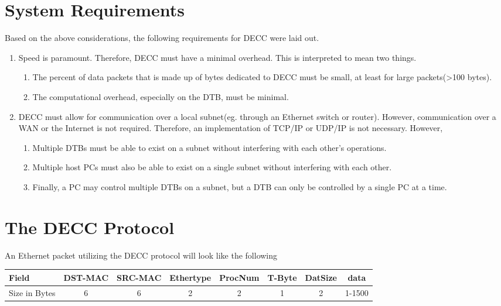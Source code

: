 \documentclass{article}
\begin{document}
\section{System Requirements}
Based on the above considerations, the following requirements for DECC were laid
out.
\begin{enumerate}
  \item Speed is paramount. Therefore, DECC must have a minimal overhead. This
  is interpreted to mean two things.
  \begin{enumerate}
    \item The percent of data packets that is made up of bytes dedicated to DECC
    must be small, at least for large packets(\textgreater100 bytes).
    \item The computational overhead, especially on the DTB, must be minimal.
  \end{enumerate}
  \item DECC must allow for communication over a local subnet(eg. through an
  Ethernet switch or router). However, communication over a WAN or the Internet
  is not required. Therefore, an implementation of TCP/IP or UDP/IP is not
  necessary. However,
  \begin{enumerate}
    \item Multiple DTBs must be able to exist on a subnet without interfering
    with each other's operations.
    \item Multiple host PCs must also be able to exist on a single subnet
    without interfering with each other.
    \item Finally, a PC may control multiple DTBs on a subnet, but a DTB can
    only be controlled by a single PC at a time.
  \end{enumerate}
\end{enumerate}

\section{The DECC Protocol}
An Ethernet packet utilizing the DECC protocol will look like the following
\begin{table}[h]
\centering
\begin{tabular}{|l|c|c|c|c|c|c|c|}\hline
Field & DST-MAC & SRC-MAC & Ethertype & ProcNum & T-Byte & DatSize
& data \\ \hline 
Size in Bytes & 6 & 6 & 2 & 2 & 1 & 2 & 1-1500 \\ \hline
\end{tabular}
\end{table}
\end{document}

